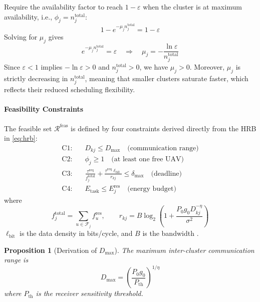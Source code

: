 \documentclass[journal]{IEEEtran}
\newtheorem{proposition}{Proposition}
\begin{document}
\begin{IEEEproof}
Require the availability factor to reach $1-\varepsilon$ when the cluster
is at maximum availability, i.e., $\phi_{j}=n_{j}^{\mathrm{total}}$:
\[
  1-e^{-\mu_{j}n_{j}^{\mathrm{total}}}=1-\varepsilon 
\]
Solving for $\mu_{j}$ gives
\[
  e^{-\mu_{j}n_{j}^{\mathrm{total}}}=\varepsilon
  \quad\Longrightarrow\quad
  \mu_{j}=-\frac{\ln\varepsilon}{n_{j}^{\mathrm{total}}} 
\]
Since $\varepsilon<1$ implies $-\ln\varepsilon>0$ and
$n_{j}^{\mathrm{total}}>0$, we have $\mu_{j}>0$. Moreover, $\mu_{j}$ is
strictly decreasing in $n_{j}^{\mathrm{total}}$, meaning that smaller
clusters saturate faster, which reflects their reduced scheduling
flexibility.


\paragraph{Feasibility Constraints}
The feasible set $\mathcal{R}^{\mathrm{feas}}$ is defined by four
constraints derived directly from the HRB in \eqref{eq:hrb}:
\begin{align}
  \text{C1:}&\quad D_{kj}\leq D_{\max}
               \quad\text{(communication range)}
               \label{eq:C1}\\
  \text{C2:}&\quad \phi_{j}\geq1
               \quad\text{(at least one free UAV)}
               \label{eq:C2}\\
  \text{C3:}&\quad
    \frac{\tau^{\mathrm{req}}}{f_{j}^{\mathrm{total}}}+
    \frac{\tau^{\mathrm{req}}\ell_{\mathrm{bit}}}{r_{kj}}
    \leq\delta_{\max}
               \quad\text{(deadline)}
               \label{eq:C3}\\
  \text{C4:}&\quad E_{\mathrm{task}}\leq E_{j}^{\mathrm{res}}
               \quad\text{(energy budget)}
               \label{eq:C4}
\end{align}
where
\begin{equation}
  f_{j}^{\mathrm{total}}=\sum_{u\in\mathcal{F}_{j}}f_{u}^{\mathrm{res}},
  \qquad
  r_{kj}=B\log_{2}\!\left(1+
  \frac{P_{0}g_{0}D_{kj}^{-\eta}}{\sigma^{2}}\right)
\end{equation}
$\ell_{\mathrm{bit}}$ is the data density in bits/cycle, and $B$ is the
bandwidth \cite{ref15,ref16}.

\begin{proposition}[Derivation of $D_{\max}$]
\label{prop:Dmax}
The maximum inter-cluster communication range is
\begin{equation}
  D_{\max}=\left(\frac{P_{0}g_{0}}{P_{\mathrm{th}}}\right)^{1/\eta}
  \label{eq:Dmax}
\end{equation}
where $P_{\mathrm{th}}$ is the receiver sensitivity threshold.
\end{proposition}


\end{IEEEproof}
\end{document}
